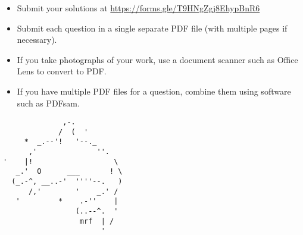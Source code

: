 \documentclass{article}
\begin{document}
\vfill
\begin{itemize}
	\item Submit your solutions at \href{https://forms.gle/T9HNgZgj8EhypBnR6}{https://forms.gle/T9HNgZgj8EhypBnR6}
	\item Submit each question in a single separate PDF file (with multiple pages if necessary).
	\item If you take photographs of your work, use a document scanner such as Office Lens to convert to PDF.
	\item If you have multiple PDF files for a question, combine them using software such as PDFsam.
\end{itemize}

\vfill
\centering
\begin{BVerbatim}
              ,-.
             /  (  '
     *  _.--'!   '--._
      ,'              ''.
'    |!                   \
   _.'  O      ___       ! \
  (_.-^, __..-'  ''''--.   )
      /,'        '    _.' /
   '         *    .-''    |
                 (..--^.  ' 
                  mrf  | /
                       '
\end{BVerbatim}
\end{document}
